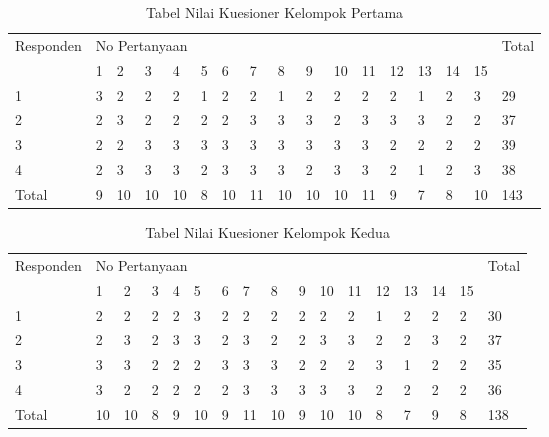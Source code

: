 \begin{table}[h]
\centering
\caption[Tabel Nilai Kuesioner Kelompok Pertama]{Tabel Nilai Kuesioner Kelompok
Pertama}
\label{tab:datakuesionerkelompokpertama}
\begin{tabular}{|l|p{0.3cm}|p{0.3cm}|p{0.3cm}|p{0.3cm}|p{0.3cm}|p{0.3cm}|p{0.3cm}|p{0.3cm}|p{0.3cm}|p{0.3cm}|p{0.3cm}|p{0.3cm}|p{0.3cm}|p{0.3cm}|p{0.3cm}|l|}
\hline
\multirow{2}{*}{Responden} & \multicolumn{15}{l|}{No Pertanyaan}                             & \multirow{2}{*}{Total} \\ \cline{2-16}
                           & 1 & 2 & 3 & 4 & 5 & 6 & 7 & 8 & 9 & 10 & 11 & 12 & 13 & 14 & 15 &                        \\ \hline
1                          & 3 & 2 & 2 & 2 & 1 & 2 & 2 & 1 & 2 & 2  & 2  & 2  & 1  & 2  & 3  & 29                     \\ \hline
2                          & 2 & 3 & 2 & 2 & 2 & 2 & 3 & 3 & 3 & 2  & 3  & 3  & 3  & 2  & 2  & 37                     \\ \hline
3                          & 2 & 2 & 3 & 3 & 3 & 3 & 3 & 3 & 3 & 3  & 3  & 2  & 2  & 2  & 2  & 39                     \\ \hline
4                          & 2 & 3 & 3 & 3 & 2 & 3 & 3 & 3 & 2 & 3  & 3  & 2  & 1  & 2  & 3  & 38                     \\ \hline
Total & 9 & 10 & 10 & 10 & 8 & 10 & 11 & 10 & 10 & 10  & 11  & 9  &
7  & 8  & 10  & 143 \\ \hline
\end{tabular}
\end{table}

\begin{table}[h]
\centering
\caption[Tabel Nilai Kuesioner Kelompok Kedua]{Tabel Nilai Kuesioner Kelompok
Kedua}
\label{tab:datakuesionerkelompokkedua}
\begin{tabular}{|l|p{0.3cm}|p{0.3cm}|p{0.3cm}|p{0.3cm}|p{0.3cm}|p{0.3cm}|p{0.3cm}|p{0.3cm}|p{0.3cm}|p{0.3cm}|p{0.3cm}|p{0.3cm}|p{0.3cm}|p{0.3cm}|p{0.3cm}|l|}
\hline
\multirow{2}{*}{Responden} & \multicolumn{15}{l|}{No Pertanyaan}                             & \multirow{2}{*}{Total} \\ \cline{2-16}
                           & 1 & 2 & 3 & 4 & 5 & 6 & 7 & 8 & 9 & 10 & 11 & 12 & 13 & 14 & 15 &                        \\ \hline
1                          & 2 & 2 & 2 & 2 & 3 & 2 & 2 & 2 & 2 & 2  & 2  & 1  & 2  & 2  & 2  & 30                     \\ \hline
2                          & 2 & 3 & 2 & 3 & 3 & 2 & 3 & 2 & 2 & 3  & 3  & 2  & 2  & 3  & 2  & 37                     \\ \hline
3                          & 3 & 3 & 2 & 2 & 2 & 3 & 3 & 3 & 2 & 2  & 2  & 3  & 1  & 2  & 2  & 35                     \\ \hline
4                          & 3 & 2 & 2 & 2 & 2 & 2 & 3 & 3 & 3 & 3  & 3  & 2  & 2  & 2  & 2  & 36                     \\ \hline
Total & 10 & 10 & 8 & 9 & 10 & 9 & 11 & 10 & 9 & 10  & 10  & 8  &
7  & 9  & 8  & 138 \\ \hline
\end{tabular}
\end{table}

